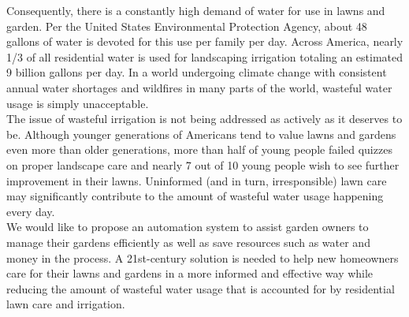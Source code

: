 \documentclass[]{article}
\begin{document}
	Consequently, there is a constantly high demand of water for use in lawns and garden. Per the United States Environmental Protection Agency, about 48 gallons of water is devoted for this use per family per day. Across America, nearly 1/3 of all residential water is used for landscaping irrigation totaling an estimated 9 billion gallons per day\cite{epa_outdoor_nodate}. In a world undergoing climate change with consistent annual water shortages and wildfires in many parts of the world, wasteful water usage is simply unacceptable. \\
	
	The issue of wasteful irrigation is not being addressed as actively as it deserves to be. Although younger generations of Americans tend to value lawns and gardens even more than older generations, more than half of young people failed quizzes on proper landscape care and nearly 7 out of 10 young people wish to see further improvement in their lawns\cite{noauthor_new_2016}. Uninformed (and in turn, irresponsible) lawn care may significantly contribute to the amount of wasteful water usage happening every day.  \\
	
	We would like to propose an automation system to assist garden owners to manage their gardens efficiently as well as save resources such as water and money in the process.
	A 21st-century solution is needed to help new homeowners care for their lawns and gardens in a more informed and effective way while reducing the amount of wasteful water usage that is accounted for by residential lawn care and irrigation.
	
\end{document}
